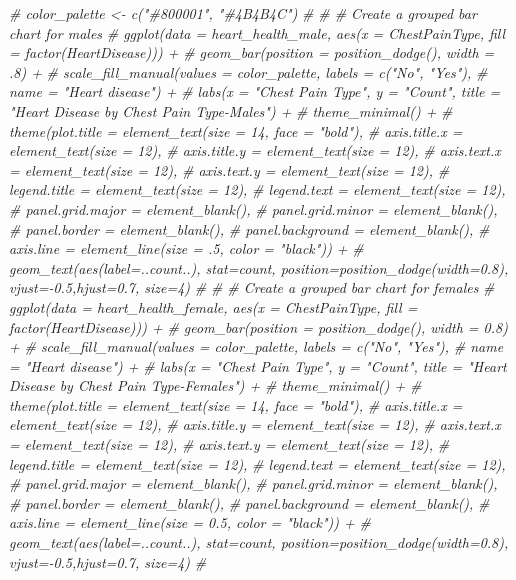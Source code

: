 \documentclass[
]{article}
\newenvironment{Shaded}{\begin{snugshade}}{\end{snugshade}}
\newcommand{\CommentTok}[1]{\textcolor[rgb]{0.56,0.35,0.01}{\textit{#1}}}
\begin{document}
\begin{Shaded}
\begin{Highlighting}[]
\CommentTok{\# color\_palette \textless{}{-} c("\#800001", "\#4B4B4C")}
\CommentTok{\# }
\CommentTok{\# \# Create a grouped bar chart for males}
\CommentTok{\# ggplot(data = heart\_health\_male, aes(x = ChestPainType, fill = factor(HeartDisease))) +}
\CommentTok{\#   geom\_bar(position = position\_dodge(), width = .8) +}
\CommentTok{\#   scale\_fill\_manual(values = color\_palette, labels = c("No", "Yes"),}
\CommentTok{\#                     name = "Heart disease") +}
\CommentTok{\#   labs(x = "Chest Pain Type", y = "Count", title = "Heart Disease by Chest Pain Type{-}Males") +}
\CommentTok{\#   theme\_minimal() +}
\CommentTok{\#   theme(plot.title = element\_text(size = 14, face = "bold"),}
\CommentTok{\#         axis.title.x = element\_text(size = 12),}
\CommentTok{\#         axis.title.y = element\_text(size = 12),}
\CommentTok{\#         axis.text.x = element\_text(size = 12),}
\CommentTok{\#         axis.text.y = element\_text(size = 12),}
\CommentTok{\#         legend.title = element\_text(size = 12),}
\CommentTok{\#         legend.text = element\_text(size = 12),}
\CommentTok{\#         panel.grid.major = element\_blank(),}
\CommentTok{\#         panel.grid.minor = element\_blank(),}
\CommentTok{\#         panel.border = element\_blank(),}
\CommentTok{\#         panel.background = element\_blank(),}
\CommentTok{\#         axis.line = element\_line(size = .5, color = "black")) +}
\CommentTok{\#   geom\_text(aes(label=..count..), stat=\textquotesingle{}count\textquotesingle{}, position=position\_dodge(width=0.8), vjust={-}0.5,hjust=0.7, size=4)}
\CommentTok{\# }
\CommentTok{\# \# Create a grouped bar chart for females}
\CommentTok{\# ggplot(data = heart\_health\_female, aes(x = ChestPainType, fill = factor(HeartDisease))) +}
\CommentTok{\#   geom\_bar(position = position\_dodge(), width = 0.8) +}
\CommentTok{\#   scale\_fill\_manual(values = color\_palette, labels = c("No", "Yes"),}
\CommentTok{\#                     name = "Heart disease") +}
\CommentTok{\#   labs(x = "Chest Pain Type", y = "Count", title = "Heart Disease by Chest Pain Type{-}Females") +}
\CommentTok{\#   theme\_minimal() +}
\CommentTok{\#   theme(plot.title = element\_text(size = 14, face = "bold"),}
\CommentTok{\#         axis.title.x = element\_text(size = 12),}
\CommentTok{\#         axis.title.y = element\_text(size = 12),}
\CommentTok{\#         axis.text.x = element\_text(size = 12),}
\CommentTok{\#         axis.text.y = element\_text(size = 12),}
\CommentTok{\#         legend.title = element\_text(size = 12),}
\CommentTok{\#         legend.text = element\_text(size = 12),}
\CommentTok{\#         panel.grid.major = element\_blank(),}
\CommentTok{\#         panel.grid.minor = element\_blank(),}
\CommentTok{\#         panel.border = element\_blank(),}
\CommentTok{\#         panel.background = element\_blank(),}
\CommentTok{\#         axis.line = element\_line(size = 0.5, color = "black")) +}
\CommentTok{\#   geom\_text(aes(label=..count..), stat=\textquotesingle{}count\textquotesingle{}, position=position\_dodge(width=0.8), vjust={-}0.5,hjust=0.7, size=4)}
\CommentTok{\# }
\end{Highlighting}
\end{Shaded}
\end{document}
